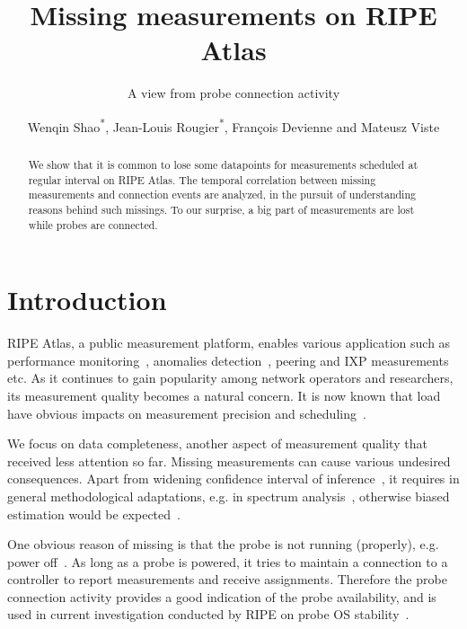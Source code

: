 \documentclass{sig-alternate-10pt}
\title{Missing measurements on RIPE Atlas}
\subtitle{\vspace{-5mm}A view from probe connection activity}
\author{
  \alignauthor 
    Wenqin Shao\textsuperscript{*}, 
    Jean-Louis Rougier\textsuperscript{*},
    François Devienne\textsuperscript{\dag} 
    and Mateusz Viste\textsuperscript{\dag} \\
\affaddr{\textsuperscript{*}Telecom ParisTech, \textsuperscript{\dag} Border 6}
}
\begin{document}
\maketitle

\begin{abstract}
We show that it is common to lose some datapoints for measurements scheduled at regular interval on RIPE Atlas. 
The temporal correlation between missing measurements and connection events are %
analyzed, in the pursuit of understanding reasons behind such missings.
To our surprise, a big part of measurements are lost while probes are connected.
\end{abstract}



\section{Introduction}
RIPE Atlas, a public measurement platform, enables various application such as performance monitoring~\cite{latencymon, Rimondini2014}, anomalies detection~\cite{Fontugne2016, Padmanabhan, halo}, peering and IXP measurements~\cite{ixp, routeixp} etc. 
As it continues to gain popularity among network operators and researchers, its measurement quality becomes a natural concern.
It is now known that load have obvious impacts on measurement precision and scheduling~\cite{Holterbach2015a, Bajpai2015}.

We focus on data completeness, another aspect of measurement quality that received less attention so far. Missing measurements can cause various undesired consequences. Apart from widening confidence interval of inference~\cite{Fontugne2016}, it requires in general methodological adaptations, e.g. in spectrum analysis~\cite{Babu2010, Luckie2014, shao2016}, otherwise biased estimation would be expected~\cite{Baraldi2010}.

One obvious reason of missing is that the probe is not running (properly), e.g. power off~\cite{schedule}.
As long as a probe is powered, it tries to maintain a connection to a controller to report measurements and receive assignments. 
Therefore the probe connection activity provides a good indication of the probe availability, and is used in current investigation conducted by RIPE on probe OS stability~\cite{1look, 2look, 3look}.
\end{document}
